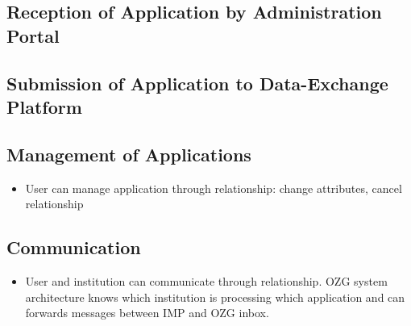 \subsection{Reception of Application by Administration Portal}
\subsection{Submission of Application to Data-Exchange Platform}

\subsection{Management of Applications}
\begin{itemize}
    \item User can manage application through relationship: change attributes, cancel relationship
\end{itemize}

\subsection{Communication}
\begin{itemize}
    \item User and institution can communicate through relationship. OZG system architecture knows which institution is processing which application and can forwards messages between IMP and OZG inbox.
\end{itemize}